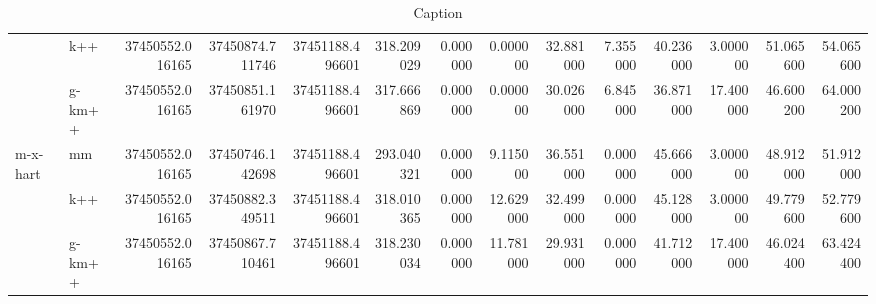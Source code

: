 \begin{table}[!ht]
{\begin{tabular}{llrrrrrrrrrrrr}
 & k++ & 37450552.016165 & 37450874.711746 & 37451188.496601 & 318.209029 & 0.000000 & 0.000000 & 32.881000 & 7.355000 & 40.236000 & 3.000000 & 51.065600 & 54.065600 \\
 & g-km++ & 37450552.016165 & 37450851.161970 & 37451188.496601 & 317.666869 & 0.000000 & 0.000000 & 30.026000 & 6.845000 & 36.871000 & 17.400000 & 46.600200 & 64.000200 \\
\cline{1-14}
\multirow[t]{3}{*}{m-x-hart} & mm & 37450552.016165 & 37450746.142698 & 37451188.496601 & 293.040321 & 0.000000 & 9.115000 & 36.551000 & 0.000000 & 45.666000 & 3.000000 & 48.912000 & 51.912000 \\
 & k++ & 37450552.016165 & 37450882.349511 & 37451188.496601 & 318.010365 & 0.000000 & 12.629000 & 32.499000 & 0.000000 & 45.128000 & 3.000000 & 49.779600 & 52.779600 \\
 & g-km++ & 37450552.016165 & 37450867.710461 & 37451188.496601 & 318.230034 & 0.000000 & 11.781000 & 29.931000 & 0.000000 & 41.712000 & 17.400000 & 46.024400 & 63.424400 \\
\cline{1-14}
\hline
\end{tabular}
}

\caption{Caption}
\label{tab:my_label}
\end{table}